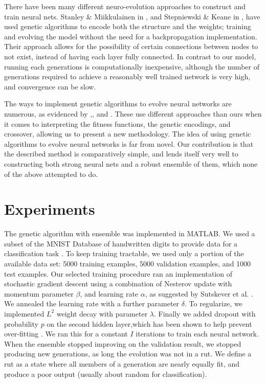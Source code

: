 \documentclass{article}
\DeclareMathOperator{\1}{\mathbbm{1}}
\begin{document}
There have been many different neuro-evolution approaches to construct and train neural nets.
Stanley \&  Miikkulainen in \cite{Stanley}, and Stepniewski \& Keane in \cite{Stepniewski},
have used genetic algorithms to encode both the structure and the weights; 
training and evolving the model without the need for a backpropagation implementation.  
Their approach allows for the possibility of certain connections between nodes to not exist, instead
of having each layer fully connected. In contrast to our model, running each 
generations is computationally inexpensive, although the number of generations required to achieve a reasonably well trained
network is very high, and convergence can be slow.

The ways to implement genetic algorithms to evolve neural networks are numerous, as evidenced by \cite{Miller},\cite{Montana}, and \cite{Zhang}.
These use different approaches than ours when it comes to interpreting the fitness functions,
the genetic encodings, and crossover, allowing us to present a new methodology.
The idea of using genetic algorithms to evolve neural networks is far from novel. 
Our contribution is that the described method is comparatively simple, and lends itself very well to constructing both strong neural nets
and a robust ensemble of them, which none of the above attempted to do.

\section{Experiments}
The genetic algorithm with ensemble was implemented in MATLAB. We used a subset of the MNIST Database of handwritten digits
to provide data for a classification task \cite{mnistlecun}. To keep training tractable, we used only a portion of the available data set:
5000 training examples, 5000 validation examples, and 1000 test examples. 
Our selected training procedure ran an implementation of stochastic gradient descent
using a combination of Nesterov update with momentum parameter $\beta$, and learning rate $\alpha$, as suggested by Sutskever et al. \cite{sutskever}.
We annealed the learning rate with a further parameter $\delta$. 
To regularize, we implemented $L^2$ weight decay with parameter $\lambda$.
Finally we added dropout with probability $p$ on the second hidden layer,which has been shown to help prevent over-fitting \cite{srivastava}.
We ran this for a constant $I$ iterations to train each neural network. When the ensemble stopped improving on the validation
result, we stopped producing new generations, as long the evolution was not in a rut. We define a rut as a state where
all members of a generation are nearly equally fit, and produce a poor output (usually about random for classification).
\end{document}
